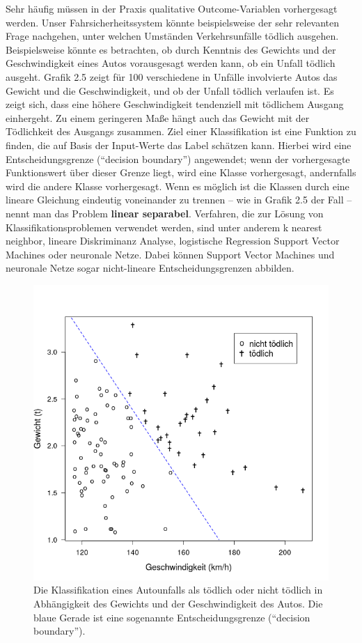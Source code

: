 Sehr häufig müssen in der Praxis qualitative Outcome-Variablen vorhergesagt
werden. Unser Fahrsicherheitssystem könnte beispielsweise der sehr relevanten Frage
nachgehen, unter welchen Umständen Verkehrsunfälle tödlich ausgehen. Beispielsweise
könnte es betrachten, ob durch Kenntnis des Gewichts und der Geschwindigkeit eines
Autos vorausgesagt werden kann, ob ein Unfall tödlich ausgeht. Grafik 2.5 zeigt für
100 verschiedene in Unfälle involvierte Autos das Gewicht und die Geschwindigkeit,
und ob der Unfall tödlich verlaufen ist. Es zeigt sich, dass eine höhere
Geschwindigkeit tendenziell mit tödlichem Ausgang einhergeht. Zu einem geringeren
Maße hängt auch das Gewicht mit der Tödlichkeit des Ausgangs zusammen. Ziel einer
Klassifikation ist eine Funktion zu finden, die auf Basis der Input-Werte das Label
schätzen kann. Hierbei wird eine Entscheidungsgrenze ("`decision boundary"')
angewendet; wenn der vorhergesagte Funktionswert über dieser Grenze liegt, wird eine
Klasse vorhergesagt, andernfalls wird die andere Klasse vorhergesagt. Wenn es möglich
ist die Klassen durch eine lineare Gleichung eindeutig voneinander zu trennen -- wie
in Grafik 2.5 der Fall -- nennt man das Problem \textbf{linear separabel}.
Verfahren, die zur Lösung von Klassifikationsproblemen verwendet werden, sind unter
anderem k nearest neighbor, lineare Diskriminanz Analyse, logistische Regression
Support Vector Machines oder neuronale Netze. Dabei können Support Vector Machines
und neuronale Netze sogar nicht-lineare Entscheidungsgrenzen abbilden.

\begin{figure}[!ht]
  \caption{Die Klassifikation eines Autounfalls als tödlich oder nicht tödlich in
    Abhängigkeit des Gewichts und der Geschwindigkeit des Autos. Die blaue Gerade ist
    eine sogenannte Entscheidungsgrenze ("`decision boundary"').} \centering
  \includegraphics[width=1\textwidth]{chapters/svm/death_data.png}
\end{figure}

